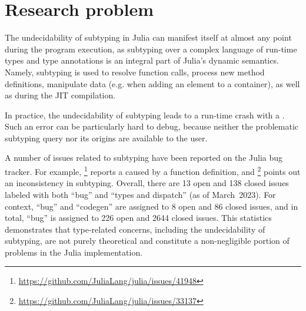 \chapter{Research problem}\label{chap:3}

The undecidability of subtyping in Julia
can manifest itself at almost any point during the program execution,
as subtyping over a complex language of run-time types and type annotations
is an integral part of Julia's dynamic semantics.
Namely, subtyping is used to resolve function calls,
process new method definitions,
manipulate data (e.g. when adding an element to a container),
as well as during the JIT compilation.

In practice, the undecidability of subtyping leads to 
a run-time crash with a .
Such an error can be particularly hard to debug,
because neither the problematic subtyping query nor its origins are available
to the user.

A number of issues related to subtyping have been reported
on the Julia bug tracker. For example,
\href{https://github.com/JuliaLang/julia/issues/41948}{}\footnote{
    \url{https://github.com/JuliaLang/julia/issues/41948}
} reports a  caused by a function definition,
and
\href{https://github.com/JuliaLang/julia/issues/33137}{}\footnote{
    \url{https://github.com/JuliaLang/julia/issues/33137}
} points out an inconsistency in subtyping. %
Overall, there are 13 open and 138 closed issues labeled with both ``bug''
and ``types and dispatch'' (as of March~2023). For context, ``bug'' and
``codegen'' are assigned to 8 open and 86 closed issues, and in total, ``bug''
is assigned to 226 open and 2644 closed issues.
This statistics demonstrates that type-related concerns,
including the undecidability of subtyping,
are not purely theoretical and
constitute a non-negligible portion of problems in the Julia implementation.

